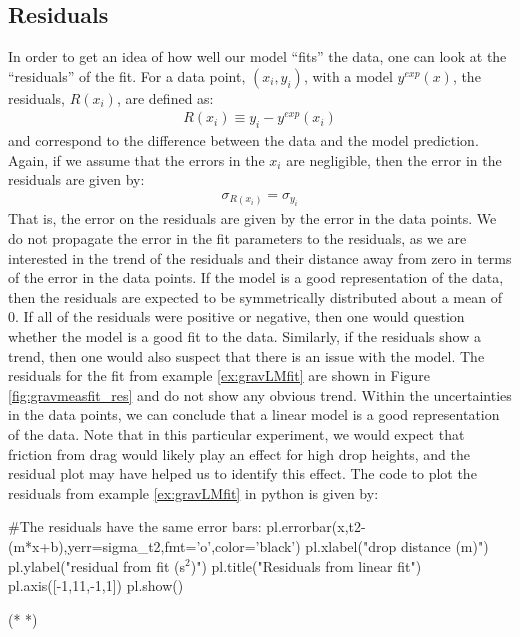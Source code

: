 \subsection{Residuals}
In order to get an idea of how well our model ``fits'' the data, one can look at the ``residuals'' of the fit. For a data point, $(x_i,y_i)$, with a model $y^{exp}(x)$, the residuals, $R(x_i)$, are defined as:
\begin{align}
R(x_i)\equiv y_i-y^{exp}(x_i)
\end{align}
and correspond to the difference between the data and the model prediction. Again, if we assume that the errors in the $x_i$ are negligible, then the error in the residuals are given by:
\begin{align}
\sigma_{R(x_i)}=\sigma_{y_i}
\end{align}
That is, the error on the residuals are given by the error in the data points. We do not propagate the error in the fit parameters to the residuals, as we are interested in the trend of the residuals and their distance away from zero in terms of the error in the data points. If the model is a good representation of the data, then the residuals are expected to be symmetrically distributed about a mean of 0. If all of the residuals were positive or negative, then one would question whether the model is a good fit to the data. Similarly, if the residuals show a trend, then one would also suspect that there is an issue with the model. The residuals for the fit from example \ref{ex:gravLMfit} are shown in Figure \ref{fig:gravmeasfit_res} and do not show any obvious trend. Within the uncertainties in the data points, we can conclude that a linear model is a good representation of the data. Note that in this particular experiment, we would expect that friction from drag would likely play an effect for high drop heights, and the residual plot may have helped us to identify this effect. The code to plot the residuals from example \ref{ex:gravLMfit} in python is given by:
\begin{python}[caption = Plotting residuals] 
#The residuals have the same error bars:
pl.errorbar(x,t2-(m*x+b),yerr=sigma_t2,fmt='o',color='black')
pl.xlabel("drop distance (m)")
pl.ylabel("residual from fit (s$^2$)")
pl.title("Residuals from linear fit")
pl.axis([-1,11,-1,1])
pl.show()
\end{python} 
\begin{poutput}
(*  *)
\end{poutput}

